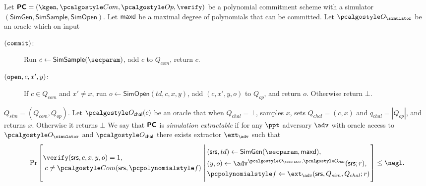 \documentclass[runningheads,11pt]{llncs}
\begin{document}
\begin{definition}
  \label{def:sepcom}
  Let $\PCOM = (\kgen, \com, \open, \verify)$ be a polynomial commitment
  scheme with a simulator $(\mathsf{SimGen}, \mathsf{SimSample}, \mathsf{SimOpen})$. Let $\mathsf{maxd}$ be a maximal degree of polynomials that can be
  committed.
  Let $\oracles$ be an oracle which on input
  \begin{description}
\item[$(\mathtt{commit})$:] Run $c \gets \mathsf{SimSample}(\secparam)$, add $c$ to $Q_{com}$, return $c$.
  \item[$(\mathtt{open}, c, x', y)$:] If $c\in Q_{{com}}$ and $x'\neq x$, run $o\gets \mathsf{SimOpen}(td,c,x,y)$, add $(c,x',y,o)$ to $Q_{op}$, and return $o$. Otherwise return $\bot$.
  \end{description}
  $Q_{sim}= (Q_{com},Q_{op})$. Let $\oraclec(c)$ be an oracle that when $Q_{chal}= \bot$, samples $x$, sets $Q_{chal}=(c,x)$ and $q_{{chal}}= |Q_{{op}}|$, and returns $x$. Otherwise it returns $\bot$
  We say that $\bm{\mathsf{PC}}$ is \emph{simulation extractable} if for any $\ppt$
  adversary $\adv$ with oracle access to $\oracles$ and $\oraclec$ there exists extractor
  $\ext_{\adv}$ such that
\[
  \Pr \left[
    \begin{aligned}
      & \verify(\srs, c, x, y, o) = 1, \\
      & \;c \neq \com(\srs, \p{f})\\
    \end{aligned}
    \,\left|\,
      \vphantom{
        \begin{aligned}
          & \\
          & \\
          & \\
          &
        \end{aligned}
        }
    \begin{aligned}
      & (\srs, td) \gets \mathsf{SimGen}(\secparam, \maxdeg),\\
      & (y, o) \gets \adv^{\oracles,\oraclec}(\srs; r), \\
      & \p{f} \gets \ext_\adv(\srs, Q_{sim}, Q_{chal}; r)
    \end{aligned}
  \right.\right]
  \leq \negl.
\]

\end{definition}
\end{document}
